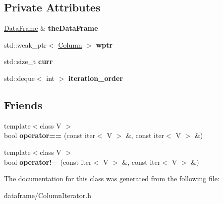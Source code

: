 \subsection*{Private Attributes}
\begin{DoxyCompactItemize}
\item 
\mbox{\label{classDataFrame_1_1ColumnIterator_ab919f4db40a13be59da3e6a6f95b1607}} 
\hyperlink{classDataFrame}{Data\+Frame} \& {\bfseries the\+Data\+Frame}
\item 
\mbox{\label{classDataFrame_1_1ColumnIterator_a7c35123239e3d9e9181abe7092a03d8c}} 
std\+::weak\+\_\+ptr$<$ \hyperlink{classColumn}{Column} $>$ {\bfseries wptr}
\item 
\mbox{\label{classDataFrame_1_1ColumnIterator_af67eee4d36c0068db457317aa2dad55f}} 
std\+::size\+\_\+t {\bfseries curr}
\item 
\mbox{\label{classDataFrame_1_1ColumnIterator_a43a3b50c683547298a7cc8324bfdbeee}} 
std\+::deque$<$ int $>$ {\bfseries iteration\+\_\+order}
\end{DoxyCompactItemize}
\subsection*{Friends}
\begin{DoxyCompactItemize}
\item 
\mbox{\label{classDataFrame_1_1ColumnIterator_a9e9de084e6237f0757aff0f5734d5b61}} 
{\footnotesize template$<$class V $>$ }\\bool {\bfseries operator==} (const iter$<$ V $>$ \&, const iter$<$ V $>$ \&)
\item 
\mbox{\label{classDataFrame_1_1ColumnIterator_aa108d2c38bd5458546a49474e799e6a5}} 
{\footnotesize template$<$class V $>$ }\\bool {\bfseries operator!=} (const iter$<$ V $>$ \&, const iter$<$ V $>$ \&)
\end{DoxyCompactItemize}


The documentation for this class was generated from the following file\+:\begin{DoxyCompactItemize}
\item 
dataframe/Column\+Iterator.\+h\end{DoxyCompactItemize}

